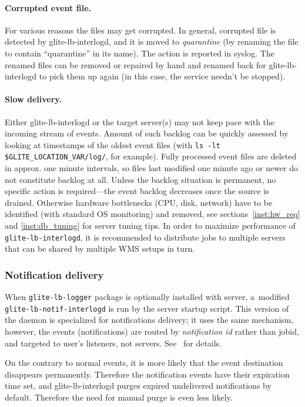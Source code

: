 \paragraph{Corrupted event file.} 
For various reasons the files may get corrupted.
In general, corrupted file is detected by glite-lb-interlogd, and it is moved
to \emph{quarantine} (by renaming the file to contain ``quarantine'' in its name).
The action is reported in syslog.
The renamed files can be removed or repaired by hand and renamed back
for glite-lb-interlogd to pick them up again
(in this case, the service needn't be stopped).

\paragraph{Slow delivery.}
Either glite-lb-interlogd or the target \LB server(s) may not keep pace 
with the incoming stream of events. 
Amount of such backlog can be quickly assessed by looking at timestamps of the oldest
event files (with \verb'ls -lt $GLITE_LOCATION_VAR/log/', for example). 
Fully processed event files are deleted in approx. one minute intervals, 
so files last modified one minute ago or newer do not constitute backlog at all.
Unless the backlog situation is permanent, no specific action is required---the 
event backlog decreases once the source is drained.
Otherwise hardware bottlenecks (CPU, disk, network) have to be identified
(with standard OS monitoring) and removed, see sections~\ref{inst:hw_req} and
\ref{inst:db_tuning} for \LB server tuning tips. In order to maximize 
performance of \verb'glite-lb-interlogd', it is recommended to distribute
jobs to multiple \LB servers that can be shared by multiple WMS setups in turn.

\subsubsection{Notification delivery}
\begin{sloppypar}
When \verb'glite-lb-logger' package is optionally installed with \LB server, 
a~modified \verb'glite-lb-notif-interlogd' is run by the server startup
script.
This version of the daemon is specialized for \LB notifications delivery;
it uses the same mechanism, however, the events (notifications) are routed
by \emph{notification id} rather than jobid, and targeted to user's listeners,
not \LB servers.
See~\cite{lbug, lbdg} for details.
\end{sloppypar}

On the contrary to normal events, it is more likely that the event destination
disappears permanently.
Therefore the notification events have their expiration time set,
and glite-lb-interlogd purges expired undelivered notifications by default.
Therefore the need for manual purge is even less likely.

